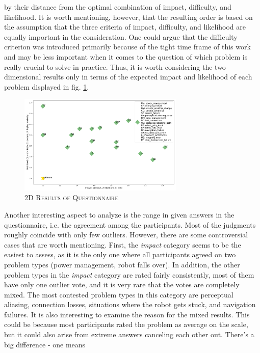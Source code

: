 \documentclass[english, master, utf8]{base/thesis_KBS}
\begin{document}
by their distance from the optimal combination of impact, difficulty, and likelihood. It is worth mentioning, however, that the resulting order is based on the assumption
that the three criteria of impact, difficulty, and likelihood are equally important in the consideration. One could argue that the difficulty criterion was introduced 
primarily because of the tight time frame of this work and may be less important when it comes to the question of which problem is really crucial to solve in practice.
Thus, it is worth considering the two-dimensional results only in terms of the expected impact and likelihood of each problem displayed in fig. \ref{fig:questionnaire_results_2d}.
\begin{figure}[H]
    \centering
    \includegraphics[width=0.7\textwidth]{pics/questionnaire_2d.png}
    \caption{\textsc{2D Results of Questionnaire}}
    \label{fig:questionnaire_results_2d}
\end{figure}
\noindent
Another interesting aspect to analyze is the range in given answers in the questionnaire, i.e. the agreement among the participants. Most of the judgments roughly coincide with
only few outliers. However, there are some controversial cases that are worth mentioning. First, the \textit{impact} category seems to be the easiest to assess, as it is the only
one where all participants agreed on two problem types (power management, robot falls over). In addition, the other problem types in the \textit{impact} category are rated fairly
consistently, most of them have only one outlier vote, and it is very rare that the votes are completely mixed. The most contested problem types in this category are perceptual
aliasing, connection losses, situations where the robot gets stuck, and navigation failures. It is also interesting to examine the reason for the mixed results. This could be
because most participants rated the problem as average on the scale, but it could also arise from extreme answers canceling each other out. There's a big difference - one means
\end{document}
